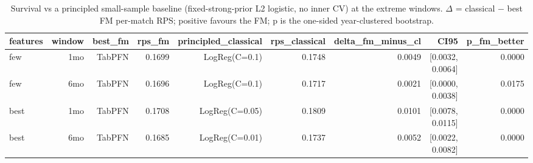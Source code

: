 \begin{table}[t]
  \centering
  \caption{Survival vs a principled small-sample baseline (fixed-strong-prior L2 logistic, no inner CV) at the extreme windows. $\Delta$ = classical $-$ best FM per-match RPS; positive favours the FM; p is the one-sided year-clustered bootstrap.}
  \label{tab:rev_principled}
  \begin{tabular}{lrrrrrrrr}
  \toprule
  features & window & best\_fm & rps\_fm & principled\_classical & rps\_classical & delta\_fm\_minus\_cl & CI95 & p\_fm\_better \\
  \midrule
  few & 1mo & TabPFN & 0.1699 & LogReg(C=0.1) & 0.1748 & 0.0049 & [0.0032, 0.0064] & 0.0000 \\
  few & 6mo & TabPFN & 0.1696 & LogReg(C=0.1) & 0.1717 & 0.0021 & [0.0000, 0.0038] & 0.0175 \\
  best & 1mo & TabPFN & 0.1708 & LogReg(C=0.05) & 0.1809 & 0.0101 & [0.0078, 0.0115] & 0.0000 \\
  best & 6mo & TabPFN & 0.1685 & LogReg(C=0.01) & 0.1737 & 0.0052 & [0.0022, 0.0082] & 0.0000 \\
  \bottomrule
  \end{tabular}
\end{table}

